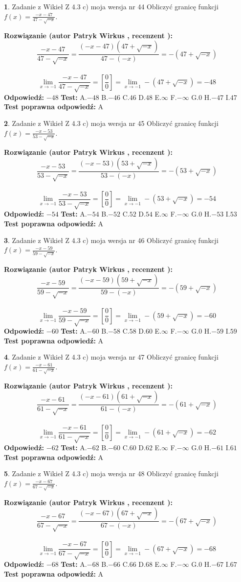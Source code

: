 \documentclass[12pt, a4paper]{article}
\theoremstyle{definition} %
\newtheorem{zad}{}
\newcommand{\zadStart}[1]{\begin{zad}#1\newline}
\newcommand{\zadStop}{\end{zad}}
\newcommand{\rozwStart}[2]{\noindent \textbf{Rozwiązanie (autor #1 , recenzent #2): }\newline}
\newcommand{\rozwStop}{\newline}
\newcommand{\odpStart}{\noindent \textbf{Odpowiedź:}\newline}
\newcommand{\odpStop}{\newline}
\newcommand{\testStart}{\noindent \textbf{Test:}\newline}
\newcommand{\testStop}{\newline}
\newcommand{\kluczStart}{\noindent \textbf{Test poprawna odpowiedź:}\newline}
\newcommand{\kluczStop}{\newline}
\begin{document}
\zadStart{Zadanie z Wikieł Z 4.3 c) moja wersja nr 44}
Obliczyć granicę funkcji $f(x)=\frac{-x-47}{47-\sqrt{-x}}$.
\zadStop
\rozwStart{Patryk Wirkus}{}
$$\frac{-x-47}{47-\sqrt{-x}}=\frac{(-x-47)(47+\sqrt{-x})}{47-(-x)}=-(47+\sqrt{-x})$$
\\
$$\lim\limits_{x\to-1}\frac{-x-47}{47-\sqrt{-x}}=[\frac{0}{0}]=\lim\limits_{x\to-1}-(47+\sqrt{-x}) =-48$$
\rozwStop
\odpStart
$-48$
\odpStop
\testStart
A.$-48$
B.$-46$
C.$46$
D.$48$
E.$\infty$
F.$-\infty$
G.$0$
H.$-47$
I.$47$
\testStop
\kluczStart
A
\kluczStop



\zadStart{Zadanie z Wikieł Z 4.3 c) moja wersja nr 45}
Obliczyć granicę funkcji $f(x)=\frac{-x-53}{53-\sqrt{-x}}$.
\zadStop
\rozwStart{Patryk Wirkus}{}
$$\frac{-x-53}{53-\sqrt{-x}}=\frac{(-x-53)(53+\sqrt{-x})}{53-(-x)}=-(53+\sqrt{-x})$$
\\
$$\lim\limits_{x\to-1}\frac{-x-53}{53-\sqrt{-x}}=[\frac{0}{0}]=\lim\limits_{x\to-1}-(53+\sqrt{-x}) =-54$$
\rozwStop
\odpStart
$-54$
\odpStop
\testStart
A.$-54$
B.$-52$
C.$52$
D.$54$
E.$\infty$
F.$-\infty$
G.$0$
H.$-53$
I.$53$
\testStop
\kluczStart
A
\kluczStop



\zadStart{Zadanie z Wikieł Z 4.3 c) moja wersja nr 46}
Obliczyć granicę funkcji $f(x)=\frac{-x-59}{59-\sqrt{-x}}$.
\zadStop
\rozwStart{Patryk Wirkus}{}
$$\frac{-x-59}{59-\sqrt{-x}}=\frac{(-x-59)(59+\sqrt{-x})}{59-(-x)}=-(59+\sqrt{-x})$$
\\
$$\lim\limits_{x\to-1}\frac{-x-59}{59-\sqrt{-x}}=[\frac{0}{0}]=\lim\limits_{x\to-1}-(59+\sqrt{-x}) =-60$$
\rozwStop
\odpStart
$-60$
\odpStop
\testStart
A.$-60$
B.$-58$
C.$58$
D.$60$
E.$\infty$
F.$-\infty$
G.$0$
H.$-59$
I.$59$
\testStop
\kluczStart
A
\kluczStop



\zadStart{Zadanie z Wikieł Z 4.3 c) moja wersja nr 47}
Obliczyć granicę funkcji $f(x)=\frac{-x-61}{61-\sqrt{-x}}$.
\zadStop
\rozwStart{Patryk Wirkus}{}
$$\frac{-x-61}{61-\sqrt{-x}}=\frac{(-x-61)(61+\sqrt{-x})}{61-(-x)}=-(61+\sqrt{-x})$$
\\
$$\lim\limits_{x\to-1}\frac{-x-61}{61-\sqrt{-x}}=[\frac{0}{0}]=\lim\limits_{x\to-1}-(61+\sqrt{-x}) =-62$$
\rozwStop
\odpStart
$-62$
\odpStop
\testStart
A.$-62$
B.$-60$
C.$60$
D.$62$
E.$\infty$
F.$-\infty$
G.$0$
H.$-61$
I.$61$
\testStop
\kluczStart
A
\kluczStop



\zadStart{Zadanie z Wikieł Z 4.3 c) moja wersja nr 48}
Obliczyć granicę funkcji $f(x)=\frac{-x-67}{67-\sqrt{-x}}$.
\zadStop
\rozwStart{Patryk Wirkus}{}
$$\frac{-x-67}{67-\sqrt{-x}}=\frac{(-x-67)(67+\sqrt{-x})}{67-(-x)}=-(67+\sqrt{-x})$$
\\
$$\lim\limits_{x\to-1}\frac{-x-67}{67-\sqrt{-x}}=[\frac{0}{0}]=\lim\limits_{x\to-1}-(67+\sqrt{-x}) =-68$$
\rozwStop
\odpStart
$-68$
\odpStop
\testStart
A.$-68$
B.$-66$
C.$66$
D.$68$
E.$\infty$
F.$-\infty$
G.$0$
H.$-67$
I.$67$
\testStop
\kluczStart
A
\kluczStop
\end{document}
